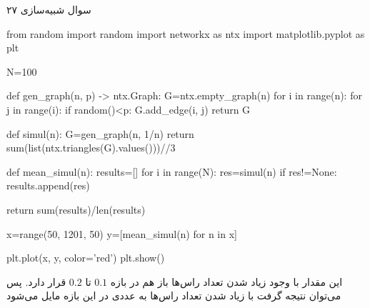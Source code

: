 سوال شبیه‌سازی ۲۷

\begin{latin}
\begin{python}
from random import random
import networkx as ntx
import matplotlib.pyplot as plt

N=100

def gen_graph(n, p) -> ntx.Graph:
	G=ntx.empty_graph(n)
	for i in range(n):
		for j in range(i):
			if random()<p:
				G.add_edge(i, j)
	return G

def simul(n):
	G=gen_graph(n, 1/n)
	return sum(list(ntx.triangles(G).values()))//3

def mean_simul(n):
	results=[]
	for i in range(N):
		res=simul(n)
		if res!=None:
			results.append(res)
	
	return sum(results)/len(results)

x=range(50, 1201, 50)
y=[mean_simul(n) for n in x]

plt.plot(x, y, color='red')
plt.show()
\end{python}
\end{latin}

این مقدار با وجود زیاد شدن تعداد راس‌ها باز هم در بازه 
$0.1$
تا 
$0.2$
قرار دارد.
پس می‌توان نتیجه گرفت با زیاد شدن تعداد راس‌ها به عددی در این بازه مایل می‌شود